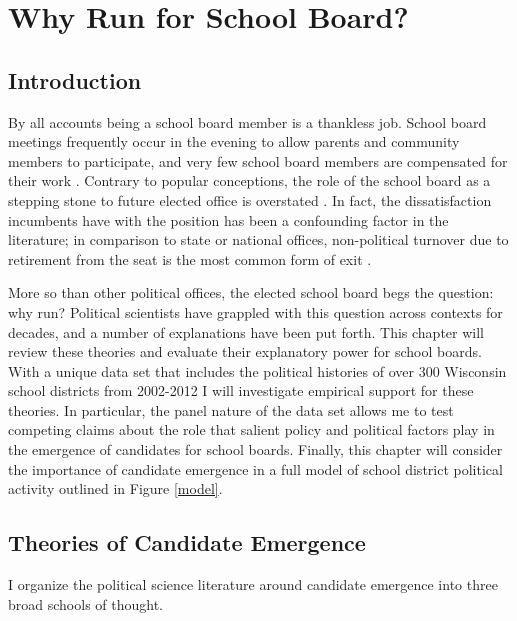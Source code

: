 \chapter{Why Run for School Board?}
\label{chap:candidacy}





\section{Introduction}

By all accounts being a school board member is a thankless job. 
School board meetings frequently occur in the evening to allow parents and 
community members to participate, and very few school board members are 
compensated for their work \citep{RefWorks:333, RefWorks:321}. Contrary to 
popular conceptions, the role of the school board as a stepping stone to future 
elected office is overstated \citep{RefWorks:321, RefWorks:322}. In fact, the dissatisfaction
incumbents have with the position has been a confounding factor in the literature; 
in comparison to state or national offices, non-political turnover due to 
retirement from the seat is the most common form of exit \citep{RefWorks:311}. 


More so than other political offices, the elected school 
board begs the question: why run? Political scientists have grappled with this 
question across contexts for decades, and a number of explanations have been put 
forth. This chapter will review these theories and evaluate their explanatory power 
for school boards. With a unique data set that includes the political 
histories of over 300 Wisconsin school districts from 2002-2012 I will investigate 
empirical support for these theories. In particular, the panel nature of the 
data set allows me to test competing claims about the role that salient policy 
and political factors play in the emergence of candidates for school boards. 
Finally, this chapter will consider the importance of candidate emergence in a 
full model of school district political activity outlined in Figure \ref{model}. 

\section{Theories of Candidate Emergence}

I organize the political science literature around candidate emergence into three broad schools of thought.

